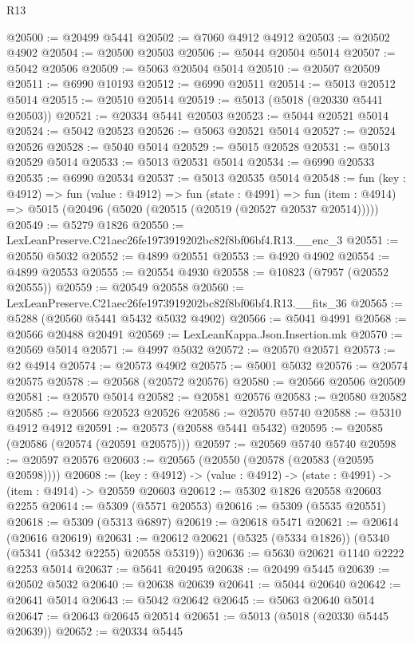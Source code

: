 \begin{lexlean}{R13}
\begin{coremodule}
@20500 := @20499 @5441
@20502 := @7060 @4912 @4912
@20503 := @20502 @4902
@20504 := @20500 @20503
@20506 := @5044 @20504 @5014
@20507 := @5042 @20506
@20509 := @5063 @20504 @5014
@20510 := @20507 @20509
@20511 := @6990 @10193
@20512 := @6990 @20511
@20514 := @5013 @20512 @5014
@20515 := @20510 @20514
@20519 := @5013 (@5018 (@20330 @5441 @20503))
@20521 := @20334 @5441 @20503
@20523 := @5044 @20521 @5014
@20524 := @5042 @20523
@20526 := @5063 @20521 @5014
@20527 := @20524 @20526
@20528 := @5040 @5014
@20529 := @5015 @20528
@20531 := @5013 @20529 @5014
@20533 := @5013 @20531 @5014
@20534 := @6990 @20533
@20535 := @6990 @20534
@20537 := @5013 @20535 @5014
@20548 := fun (key : @4912) =>
  fun (value : @4912) =>
  fun (state : @4991) =>
  fun (item : @4914) => @5015 (@20496 (@5020 (@20515 (@20519 (@20527 @20537 @20514)))))
@20549 := @5279 @1826
@20550 := LexLeanPreserve.C21aec26fe1973919202bc82f8bf06bf4.R13.__enc_3
@20551 := @20550 @5032
@20552 := @4899 @20551
@20553 := @4920 @4902
@20554 := @4899 @20553
@20555 := @20554 @4930
@20558 := @10823 (@7957 (@20552 @20555))
@20559 := @20549 @20558
@20560 := LexLeanPreserve.C21aec26fe1973919202bc82f8bf06bf4.R13.__fits_36
@20565 := @5288 (@20560 @5441 @5432 @5032 @4902)
@20566 := @5041 @4991
@20568 := @20566 @20488 @20491
@20569 := LexLeanKappa.Json.Insertion.mk
@20570 := @20569 @5014
@20571 := @4997 @5032
@20572 := @20570 @20571
@20573 := @2 @4914
@20574 := @20573 @4902
@20575 := @5001 @5032
@20576 := @20574 @20575
@20578 := @20568 (@20572 @20576)
@20580 := @20566 @20506 @20509
@20581 := @20570 @5014
@20582 := @20581 @20576
@20583 := @20580 @20582
@20585 := @20566 @20523 @20526
@20586 := @20570 @5740
@20588 := @5310 @4912 @4912
@20591 := @20573 (@20588 @5441 @5432)
@20595 := @20585 (@20586 (@20574 (@20591 @20575)))
@20597 := @20569 @5740 @5740
@20598 := @20597 @20576
@20603 := @20565 (@20550 (@20578 (@20583 (@20595 @20598))))
@20608 := (key : @4912) -> (value : @4912) -> (state : @4991) -> (item : @4914) -> @20559 @20603
@20612 := @5302 @1826 @20558 @20603 @2255
@20614 := @5309 (@5571 @20553)
@20616 := @5309 (@5535 @20551)
@20618 := @5309 (@5313 @6897)
@20619 := @20618 @5471
@20621 := @20614 (@20616 @20619)
@20631 := @20612 @20621 (@5325 (@5334 @1826)) (@5340 (@5341 (@5342 @2255) @20558 @5319))
@20636 := @5630 @20621 @1140 @2222 @2253 @5014
@20637 := @5641 @20495
@20638 := @20499 @5445
@20639 := @20502 @5032
@20640 := @20638 @20639
@20641 := @5044 @20640
@20642 := @20641 @5014
@20643 := @5042 @20642
@20645 := @5063 @20640 @5014
@20647 := @20643 @20645 @20514
@20651 := @5013 (@5018 (@20330 @5445 @20639))
@20652 := @20334 @5445

\end{coremodule}
\end{lexlean}

